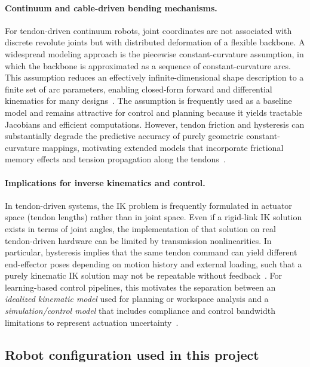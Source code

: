 \paragraph{Continuum and cable-driven bending mechanisms.}
For tendon-driven continuum robots, joint coordinates are not associated with discrete revolute joints but with distributed deformation of a flexible backbone. A widespread modeling approach is the piecewise constant-curvature assumption, in which the backbone is approximated as a sequence of constant-curvature arcs. This assumption reduces an effectively infinite-dimensional shape description to a finite set of arc parameters, enabling closed-form forward and differential kinematics for many designs~\cite{Webster2010ConstantCurvature}. The assumption is frequently used as a baseline model and remains attractive for control and planning because it yields tractable Jacobians and efficient computations. However, tendon friction and hysteresis can substantially degrade the predictive accuracy of purely geometric constant-curvature mappings, motivating extended models that incorporate frictional memory effects and tension propagation along the tendons~\cite{Kato2016Neuroendoscopy}.

\paragraph{Implications for inverse kinematics and control.}
In tendon-driven systems, the \ac{IK} problem is frequently formulated in actuator space (tendon lengths) rather than in joint space. Even if a rigid-link \ac{IK} solution exists in terms of joint angles, the implementation of that solution on real tendon-driven hardware can be limited by transmission nonlinearities. In particular, hysteresis implies that the same tendon command can yield different end-effector poses depending on motion history and external loading, such that a purely kinematic \ac{IK} solution may not be repeatable without feedback~\cite{Kato2016Neuroendoscopy}. For learning-based control pipelines, this motivates the separation between an \emph{idealized kinematic model} used for planning or workspace analysis and a \emph{simulation/control model} that includes compliance and control bandwidth limitations to represent actuation uncertainty~\cite{Miyasaka2020HysteresisFriction}.

\subsection{Robot configuration used in this project}

